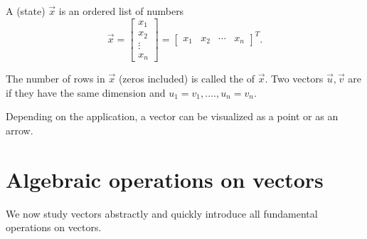 \documentclass[../main.tex]{subfiles}
\begin{document}
\begin{definition}[vectors]
  A (state)  \(\vec{x}\) is an ordered list of numbers
  \[
    \vec{x} = 
    \begin{bmatrix}
      x_{1} \\ x_{2} \\ \vdots \\ x_{n}
    \end{bmatrix}
    = 
    \begin{bmatrix}
      x_{1} & x_{2} & \cdots & x_{n}
    \end{bmatrix}^{T}.
  \]

  The number of rows in \(\vec{x}\) (zeros included) is called the  of \(\vec{x}\).  Two vectors \(\vec{u}, \vec{v}\) are  if they have the same dimension and \(u_{1} = v_{1}, \ldots., u_{n} = v_{n}\).
\end{definition}
Depending on the application, a vector can be visualized as a point or as an arrow.

\clearpage

\section{Algebraic operations on vectors}

We now study vectors abstractly and quickly introduce all fundamental operations on vectors. \medskip
\end{document}
